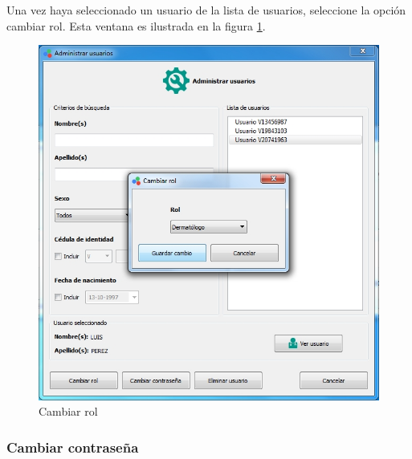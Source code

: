 		Una vez haya seleccionado un usuario de la lista de usuarios, seleccione la opci\'{o}n cambiar rol. Esta ventana es ilustrada en la figura \ref{fig:cambiar-rol}.
\vfill
\begin{figure}[H]
  \centering
  \includegraphics[width=1\linewidth]{./img/administrar-rol.jpg}
\caption[]{Cambiar rol\label{fig:cambiar-rol}}
\end{figure}
\vfill
\newpage
		\subsubsection*{Cambiar contrase\~{n}a}
		

